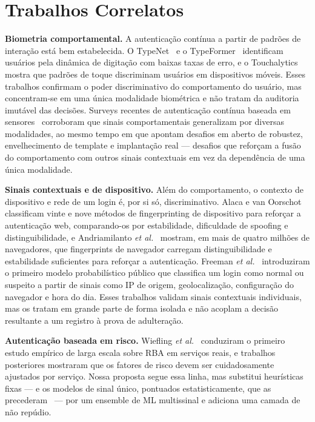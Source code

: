 \documentclass[conference]{IEEEtran}
\begin{document}
\section{Trabalhos Correlatos}
\label{sec:related}
\textbf{Biometria comportamental.} A autenticação contínua a partir de
padrões de interação está bem estabelecida. O TypeNet~\cite{acien2022} e
o TypeFormer~\cite{stragapede2024} identificam usuários pela dinâmica de
digitação com baixas taxas de erro, e o Touchalytics~\cite{frank2013}
mostra que padrões de toque discriminam usuários em dispositivos móveis.
Esses trabalhos confirmam o poder discriminativo do comportamento do
usuário, mas concentram-se em uma única modalidade biométrica e não
tratam da auditoria imutável das decisões. Surveys recentes de
autenticação contínua baseada em sensores~\cite{abuhamad2021} corroboram
que sinais comportamentais generalizam por diversas modalidades, ao
mesmo tempo em que apontam desafios em aberto de robustez, envelhecimento
de template e implantação real --- desafios que reforçam a fusão do
comportamento com outros sinais contextuais em vez da dependência de uma
única modalidade.

\textbf{Sinais contextuais e de dispositivo.} Além do comportamento, o
contexto de dispositivo e rede de um login é, por si só, discriminativo.
Alaca e van Oorschot~\cite{alaca2016} classificam vinte e nove métodos de
fingerprinting de dispositivo para reforçar a autenticação web,
comparando-os por estabilidade, dificuldade de spoofing e
distinguibilidade, e Andriamilanto \emph{et al.}~\cite{andriamilanto2021}
mostram, em mais de quatro milhões de navegadores, que fingerprints de
navegador carregam distinguibilidade e estabilidade suficientes para
reforçar a autenticação. Freeman \emph{et al.}~\cite{freeman2016}
introduziram o primeiro modelo probabilístico público que classifica um
login como normal ou suspeito a partir de sinais como IP de origem,
geolocalização, configuração do navegador e hora do dia. Esses trabalhos
validam sinais contextuais individuais, mas os tratam em grande parte de
forma isolada e não acoplam a decisão resultante a um registro à prova de
adulteração.

\textbf{Autenticação baseada em risco.} Wiefling \emph{et
al.}~\cite{wiefling2019} conduziram o primeiro estudo empírico de larga
escala sobre RBA em serviços reais, e trabalhos posteriores
\cite{wiefling2023} mostraram que os fatores de risco devem ser
cuidadosamente ajustados por serviço. Nossa proposta segue essa linha,
mas substitui heurísticas fixas --- e os modelos de sinal único,
pontuados estatisticamente, que as precederam~\cite{freeman2016} --- por
um ensemble de ML multissinal e adiciona uma camada de não repúdio.
\end{document}
